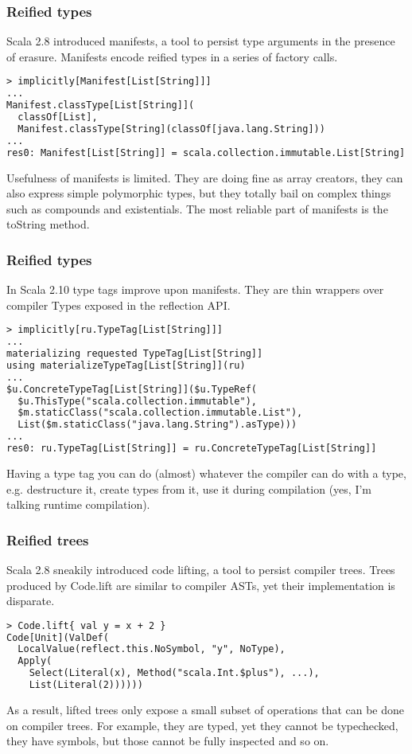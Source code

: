 \documentclass[hyperref={bookmarks=false}]{beamer}
\begin{document}
\begin{frame}[fragile]
\frametitle{Reified types}

Scala 2.8 introduced manifests, a tool to persist type arguments in the presence of erasure.
Manifests encode reified types in a series of factory calls.

\begin{lstlisting}[language=XML]
> implicitly[Manifest[List[String]]]
...
Manifest.classType[List[String]](
  classOf[List],
  Manifest.classType[String](classOf[java.lang.String]))
...
res0: Manifest[List[String]] = scala.collection.immutable.List[String]
\end{lstlisting}

Usefulness of manifests is limited. They are doing fine as array creators,
they can also express simple polymorphic types, but they totally bail on complex things
such as compounds and existentials. The most reliable part of manifests is the toString method.

\end{frame}

\begin{frame}[fragile]
\frametitle{Reified types}

In Scala 2.10 type tags improve upon manifests. They are thin wrappers over compiler Types
exposed in the reflection API.

\begin{lstlisting}[language=XML]
> implicitly[ru.TypeTag[List[String]]]
...
materializing requested TypeTag[List[String]]
using materializeTypeTag[List[String]](ru)
...
$u.ConcreteTypeTag[List[String]]($u.TypeRef(
  $u.ThisType("scala.collection.immutable"),
  $m.staticClass("scala.collection.immutable.List"),
  List($m.staticClass("java.lang.String").asType)))
...
res0: ru.TypeTag[List[String]] = ru.ConcreteTypeTag[List[String]]
\end{lstlisting}

Having a type tag you can do (almost) whatever the compiler can do with a type,
e.g. destructure it, create types from it, use it during compilation
(yes, I'm talking runtime compilation).

\end{frame}

\begin{frame}[fragile]
\frametitle{Reified trees}

Scala 2.8 sneakily introduced code lifting, a tool to persist compiler trees.
Trees produced by Code.lift are similar to compiler ASTs, yet their implementation
is disparate.

\begin{lstlisting}[language=XML]
> Code.lift{ val y = x + 2 }
Code[Unit](ValDef(
  LocalValue(reflect.this.NoSymbol, "y", NoType),
  Apply(
    Select(Literal(x), Method("scala.Int.$plus"), ...),
    List(Literal(2))))))
\end{lstlisting}

As a result, lifted trees only expose a small subset of operations that can be done on compiler trees.
For example, they are typed, yet they cannot be typechecked, they have symbols, but those cannot be fully inspected and so on.

\end{frame}
\end{document}
